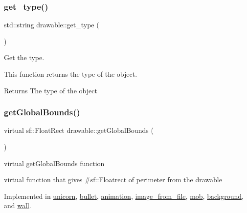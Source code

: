 \subsubsection{\texorpdfstring{get\+\_\+type()}{get\_type()}}
{\footnotesize\ttfamily std\+::string drawable\+::get\+\_\+type (\begin{DoxyParamCaption}{ }\end{DoxyParamCaption})}



Get the type. 

This function returns the type of the object.

\begin{DoxyReturn}{Returns}
The type of the object 
\end{DoxyReturn}
\mbox{\label{classdrawable_ae013ac0be47538be9ce885d6642daf73}} 
\subsubsection{\texorpdfstring{get\+Global\+Bounds()}{getGlobalBounds()}}
{\footnotesize\ttfamily virtual sf\+::\+Float\+Rect drawable\+::get\+Global\+Bounds (\begin{DoxyParamCaption}{ }\end{DoxyParamCaption})\hspace{0.3cm}{\ttfamily [pure virtual]}}



virtual get\+Global\+Bounds function 

virtual function that gives \#sf\+::\+Floatrect of perimeter from the drawable 

Implemented in \hyperlink{classunicorn_a1bac09fc59b04f14f5a093bc4daa04da}{unicorn}, \hyperlink{classbullet_a87bda5887249e8e37c5579180449bd93}{bullet}, \hyperlink{classanimation_aae3322323bf3dea83723969f364e18e0}{animation}, \hyperlink{classimage__from__file_a971a591f906fa5c6e85b4e32cfc3d6a0}{image\+\_\+from\+\_\+file}, \hyperlink{classmob_af3859378fad2a5f93a1c4d833ff74d5d}{mob}, \hyperlink{classbackground_ab5f2b627cd58e0d07678f0af01c6bd2d}{background}, and \hyperlink{classwall_a317a464c879cfdf9464bd6f1b62d9101}{wall}.

\mbox{\label{classdrawable_ac39691470b7874f5dec59efe649d3981}} 
